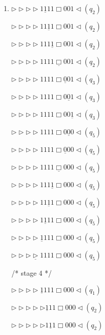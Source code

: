 \documentclass[12pt,a4paper]{article}
\makeatletter
\newtheorem*{solution}{Solution}
\theoremstyle{definition}
\renewenvironment{solution}[1][Solution] {\par\pushQED{\qed}\normalfont\topsep6\p@\@plus6\p@\relax\trivlist\item[\hskip\labelsep\bfseries#1\@addpunct{.}]\ignorespaces}{\popQED\endtrivlist\@endpefalse} \makeatother
\makeatother
\begin{document}
\begin{enumerate}
\begin{solution}
\begin{minipage}{0.3\textwidth}
		$\triangleright\triangleright\triangleright\triangleright1\underline{1}11\Box001\triangleleft(q_2)$
		
		$\triangleright\triangleright\triangleright\triangleright11\underline{1}1\Box001\triangleleft(q_2)$
		
		$\triangleright\triangleright\triangleright\triangleright111\underline{1}\Box001\triangleleft(q_2)$
		
		$\triangleright\triangleright\triangleright\triangleright1111\underline{\Box}001\triangleleft(q_2)$
		
		$\triangleright\triangleright\triangleright\triangleright1111\Box\underline{0}01\triangleleft(q_3)$
		
		$\triangleright\triangleright\triangleright\triangleright1111\Box0\underline{0}1\triangleleft(q_3)$
		
		$\triangleright\triangleright\triangleright\triangleright1111\Box00\underline{1}\triangleleft(q_3)$
		
		$\triangleright\triangleright\triangleright\triangleright1111\Box0\underline{0}0\triangleleft(q_5)$
		
		$\triangleright\triangleright\triangleright\triangleright1111\Box\underline{0}00\triangleleft(q_5)$
		
		$\triangleright\triangleright\triangleright\triangleright1111\underline{\Box}000\triangleleft(q_5)$
		
		$\triangleright\triangleright\triangleright\triangleright111\underline{1}\Box000\triangleleft(q_5)$
		
		$\triangleright\triangleright\triangleright\triangleright11\underline{1}1\Box000\triangleleft(q_5)$
		
		$\triangleright\triangleright\triangleright\triangleright1\underline{1}11\Box000\triangleleft(q_5)$
		
		$\triangleright\triangleright\triangleright\triangleright\underline{1}111\Box000\triangleleft(q_5)$
		
		$\triangleright\triangleright\triangleright\underline{\triangleright}1111\Box000\triangleleft(q_5)$
		
		\quad
		
		/* stage 4 */
		
		$\triangleright\triangleright\triangleright\triangleright\underline{1}111\Box000\triangleleft(q_1)$
		
		$\triangleright\triangleright\triangleright\triangleright\triangleright\underline{1}11\Box000\triangleleft(q_2)$
		
	\end{minipage}
	\begin{minipage}{0.3\textwidth}
		\centering
		$\triangleright\triangleright\triangleright\triangleright\triangleright1\underline{1}1\Box000\triangleleft(q_2)$
		

\end{minipage}
\end{solution}
\end{enumerate}
\end{document}
